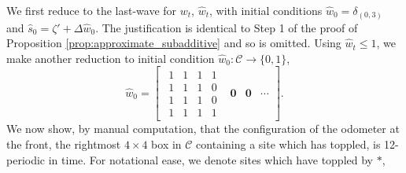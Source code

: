 \documentclass[aap]{imsart}
\begin{document}
We first reduce to the last-wave for $w_t$, $\hat{w}_t$, with initial conditions
$\hat{w}_0 = \delta_{(0,3)}$ and
$\hat{s}_0 = \zeta' + \Delta \hat{w}_0$. The justification is identical to Step 1 of the proof of Proposition \ref{prop:approximate_subadditive}
and so is omitted.  Using $\hat{w}_t \leq 1$, we make another reduction to initial condition
$\hat{w}_0: \mathcal{C} \to \{0, 1\}$, 
\[
\hat{w}_0 = 
\begin{bmatrix} 
\begin{smallmatrix}
1 & 1 & 1 & 1 \\
1 & 1 & 1 & 0 \\
1 & 1 & 1 & 0 \\
1 & 1 & 1 & 1 
\end{smallmatrix}
& \mathbf{0} & \mathbf{0} & \cdots
\end{bmatrix}.
\]
\setcounter{MaxMatrixCols}{50}
We now show, by manual computation, that the configuration of the odometer at the front, the rightmost $4 \times 4$ box in $\mathcal{C}$ containing a site which has toppled, 
is 12-periodic in time. For notational ease, we denote sites which have toppled by $*$, 
\end{document}
